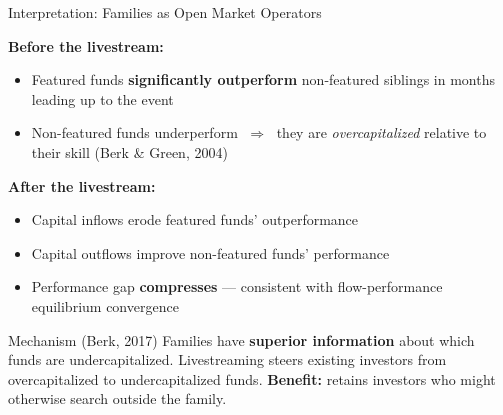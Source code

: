 \documentclass[11pt, aspectratio=169]{beamer}
\newcommand{\hl}[1]{\textcolor{myblue}{\textbf{#1}}}
\begin{document}

\begin{frame}{Interpretation: Families as Open Market Operators}

\textbf{Before the livestream:}
\begin{itemize}
  \item Featured funds \hl{significantly outperform} non-featured siblings
  in months leading up to the event
  \item Non-featured funds underperform $\;\Rightarrow\;$ they are
  \textit{overcapitalized} relative to their skill (Berk \& Green, 2004)
\end{itemize}

\medskip
\textbf{After the livestream:}
\begin{itemize}
  \item Capital inflows erode featured funds' outperformance
  \item Capital outflows improve non-featured funds' performance
  \item Performance gap \hl{compresses} --- consistent with flow-performance
  equilibrium convergence
\end{itemize}

\vspace{0.2cm}
\begin{block}{Mechanism (Berk, 2017)}
  Families have \hl{superior information} about which funds are
  undercapitalized. Livestreaming steers existing investors
  from overcapitalized to undercapitalized funds.
  \textbf{Benefit:} retains investors who might otherwise search outside the family.
\end{block}

\end{frame}

\end{document}
